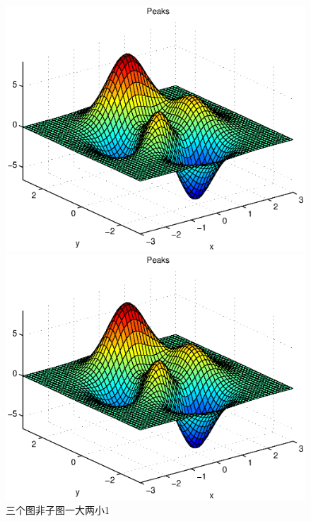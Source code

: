 \documentclass{article}
\begin{document}
    \begin{figure}[!htbp]
        \centering
        \begin{minipage}[b]{0.45\textwidth}
            \centering
            \includegraphics[width=\textwidth, height=1.2\textwidth]{example}
            \caption{三个图非子图一大两小1}
            \label{}
        \end{minipage}
        \hspace{0.5cm}%
        \begin{minipage}[b]{0.4\textwidth}
            \begin{minipage}[b]{\textwidth}
                \centering
                \includegraphics[width=\textwidth]{example}

\end{minipage}
\end{minipage}
\end{figure}
\end{document}
